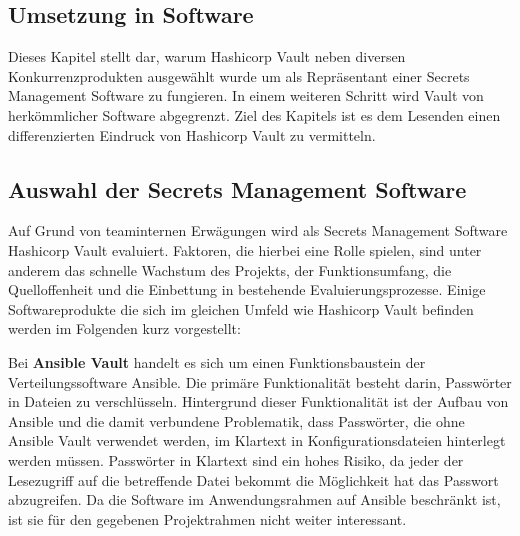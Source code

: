 \documentclass[
book,
a4paper,   
titlepage,  
halfparskip,
12pt        
]{scrartcl}
\begin{document}
\begin{onehalfspacing}
\newpage
\section{Umsetzung in Software}
\label{sec:soft}

Dieses Kapitel stellt dar, warum Hashicorp Vault neben diversen Konkurrenzprodukten ausgewählt wurde um als Repräsentant einer Secrets Management Software zu fungieren. In einem weiteren Schritt wird Vault von herkömmlicher Software abgegrenzt. Ziel des Kapitels ist es dem Lesenden einen differenzierten Eindruck von Hashicorp Vault zu vermitteln. 

\subsection{Auswahl der Secrets Management Software}
\label{subsec:chocho}
Auf Grund von teaminternen Erwägungen wird als Secrets Management Software Hashicorp Vault evaluiert. Faktoren, die hierbei eine Rolle spielen, sind unter anderem das schnelle Wachstum des Projekts, der Funktionsumfang, die Quelloffenheit und die Einbettung in bestehende Evaluierungsprozesse. Einige Softwareprodukte die sich im gleichen Umfeld wie Hashicorp Vault befinden werden im Folgenden kurz vorgestellt:\cite{github}

Bei \textbf{Ansible Vault} handelt es sich um einen Funktionsbaustein der Verteilungssoftware Ansible. Die primäre Funktionalität besteht darin, Passwörter in Dateien zu verschlüsseln. Hintergrund dieser Funktionalität ist der Aufbau von Ansible und die damit verbundene Problematik, dass Passwörter, die ohne Ansible Vault verwendet werden, im Klartext in Konfigurationsdateien hinterlegt werden müssen. Passwörter in Klartext sind ein hohes Risiko, da jeder der Lesezugriff auf die betreffende Datei bekommt die Möglichkeit hat das Passwort abzugreifen.\cite{ansible} Da die Software im Anwendungsrahmen auf Ansible beschränkt ist, ist sie für den gegebenen Projektrahmen nicht weiter interessant.


\end{onehalfspacing}
\end{document}
